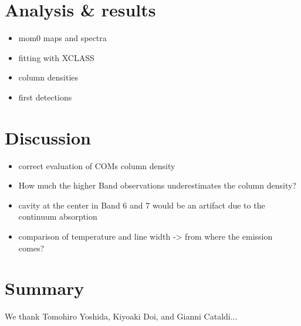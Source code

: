 \documentclass[linenumbers, twocolumn, times]{aastex631}
\begin{document}
\section{Analysis \& results} \label{sec:analysis}
\begin{itemize}
    \item mom0 maps and spectra
    \item fitting with XCLASS
    \item column densities
    \item first detections
\end{itemize}

\section{Discussion} \label{sec:discussion}
\begin{itemize}
    \item correct evaluation of COMs column density
    \item How much the higher Band observations underestimates the column density?
    \item cavity at the center in Band 6 and 7 would be an artifact due to the continuum absorption
    \item comparison of temperature and line width -> from where the emission comes?
\end{itemize}

\section{Summary} \label{sec:summary}


\begin{acknowledgments}
We thank Tomohiro Yoshida, Kiyoaki Doi, and Gianni Cataldi...
\end{acknowledgments}

%

\vspace{5mm}
\facilities{\textcolor{red}{facilities used here}}
\end{document}
